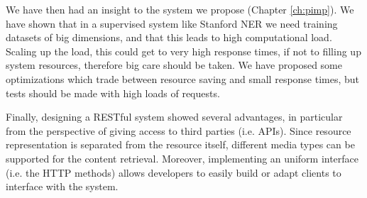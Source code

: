 \documentclass[a4paper,11pt]{report}
\begin{document}
We have then had an insight to the system we propose (Chapter \ref{ch:pimp}). We have shown that in a supervised system like Stanford NER we need training datasets of big dimensions, and that this leads to high computational load. Scaling up the load, this could get to very high response times, if not to filling up system resources, therefore big care should be taken. We have proposed some optimizations which trade between resource saving and small response times, but tests should be made with high loads of requests.

Finally, designing a RESTful system showed several advantages, in particular from the perspective of giving access to third parties (i.e. APIs). Since resource representation is separated from the resource itself, different media types can be supported for the content retrieval. Moreover, implementing an uniform interface (i.e. the HTTP methods) allows developers to easily build or adapt clients to interface with the system.

\cleardoublepage
{}

\nocite{*}
\end{document}
